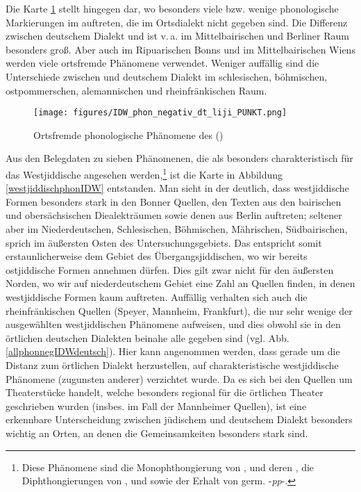  Die Karte \ref{allphonnegIDW} stellt hingegen dar, wo besonders viele bzw. wenige phonologische Markierungen im  auftreten, die im Ortsdialekt nicht gegeben sind. Die Differenz zwischen deutschem Dialekt und  ist v.\,a. im Mittelbairischen und Berliner Raum besonders groß. Aber auch im Ripuarischen Bonns und im Mittelbairischen Wiens werden viele ortsfremde Phänomene verwendet.  Weniger auffällig sind die Unterschiede zwischen  und deutschem Dialekt im schlesischen, böhmischen, ostpommerschen, alemannischen und rheinfränkischen Raum. \\
 

 \begin{figure}[h!]
		\centering
\texttt{[image: figures/IDW\_phon\_negativ\_dt\_liji\_PUNKT.png]}
		\caption{\label{allphonnegIDW} Ortsfremde phonologische Phänomene des  ()}
		\end{figure}
\FloatBarrier
 
 Aus den Belegdaten zu sieben Phänomenen, die als besonders charakteristisch für das Westjiddische angesehen werden,\footnote{Diese Phänomene sind die Monophthongierung von ,  und deren , die Diphthongierungen von ,  und  sowie der Erhalt von germ. -\textit{pp}-.} ist die Karte in Abbildung \ref{westjiddischphonIDW} entstanden. Man sieht in der  deutlich, dass westjiddische Formen besonders stark in den Bonner Quellen, den Texten aus den bairischen und obersächsischen Diealekträumen sowie denen aus Berlin auftreten; seltener aber im Niederdeutschen, Schlesischen, Böhmischen, Mährischen, Südbairischen, sprich im äußersten Osten des Untersuchungsgebiets. Das  entspricht somit erstaunlicherweise dem Gebiet des Übergangsjiddischen, wo wir bereits ostjiddische Formen annehmen dürfen. Dies gilt zwar nicht für den äußersten Norden, wo wir auf niederdeutschem Gebiet eine Zahl an Quellen finden, in denen westjiddische Formen kaum auftreten. Auffällig verhalten sich auch die rheinfränkischen Quellen (Speyer, Mannheim, Frankfurt), die nur sehr wenige der ausgewählten westjiddischen Phänomene aufweisen, und dies obwohl sie in den örtlichen deutschen Dialekten beinahe alle gegeben sind (vgl. Abb. \ref{allphonnegIDWdeutsch}). Hier kann angenommen werden, dass gerade um die Distanz zum örtlichen Dialekt herzustellen, auf charakteristische westjiddische Phänomene (zugunsten anderer) verzichtet wurde. Da es sich bei den Quellen um Theaterstücke handelt, welche besonders regional für die örtlichen Theater geschrieben wurden (insbes. im Fall der Mannheimer Quellen), ist eine erkennbare Unterscheidung zwischen jüdischem und deutschem Dialekt besonders wichtig an Orten, an denen die Gemeinsamkeiten besonders stark sind.\\

